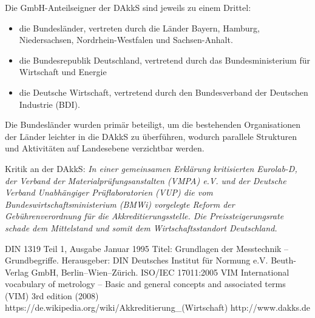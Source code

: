 Die GmbH-Anteilseigner der DAkkS sind jeweils zu einem Drittel:
\begin{itemize}
\item die Bundesländer, vertreten durch die Länder Bayern, Hamburg, Niedersachsen, Nordrhein-Westfalen und Sachsen-Anhalt. 
\item die Bundesrepublik Deutschland, vertretend durch das Bundesministerium für Wirtschaft und Energie 
\item die Deutsche Wirtschaft, vertretend durch den Bundesverband der Deutschen Industrie (BDI). 
\end{itemize}
Die Bundesländer wurden primär beteiligt, um die bestehenden Organisationen der Länder leichter in die DAkkS zu überführen, \glqq wodurch parallele Strukturen und Aktivitäten auf Landesebene verzichtbar werden\grqq.

Kritik an der DAkkS: \textit{In einer gemeinsamen Erklärung kritisierten Eurolab-D, der Verband der Materialprüfungsanstalten (VMPA) e.V. und der Deutsche Verband Unabhängiger Prüf\-labor\-atorien (VUP) die vom Bundeswirtschaftsministerium (BMWi) vorgelegte Reform der Gebührenverordnung für die Akkreditierungsstelle. Die Preissteigerungsrate schade dem Mittelstand und somit dem Wirtschaftsstandort Deutschland.}

\begin{thebibliography}{------}
	\item[] \hspace*{5em}{\Large\bf zu Kapitel 12:}
    DIN 1319 Teil 1, Ausgabe Januar 1995 Titel: Grundlagen der Messtechnik – Grundbegriffe. Herausgeber: DIN Deutsches Institut für Normung e.V. Beuth-Verlag GmbH, Berlin–Wien–Zürich.
    ISO/IEC 17011:2005 
     VIM International vocabulary of
    metrology – Basic and general
     concepts and associated terms (VIM) 3rd edition (2008)
     https://de.wikipedia.org/wiki/Akkreditierung\_(Wirtschaft)
     http://www.dakks.de
   \end{thebibliography}
\newpage


